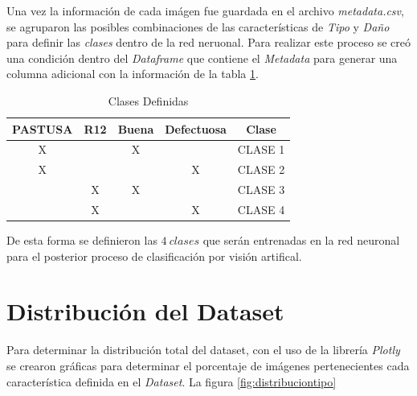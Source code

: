 	Una vez la información de cada imágen fue guardada en el archivo \textit{metadata.csv}, se agruparon las posibles combinaciones de las características de \textit{Tipo} y \textit{Daño} para definir las \textit{clases} dentro de la red neruonal. Para realizar este proceso se creó una condición dentro del \textit{Dataframe} que contiene el \textit{Metadata} para generar una columna adicional con la información de la tabla \ref{table:Clases}.	
	
	\begin{table}[ht]
		\centering
		\begin{tabular}{|c|c|c|c|c|}
			\hline
			PASTUSA & R12 & Buena & Defectuosa & Clase \\
			\hline
			X &  & X &  & CLASE 1 \\
			\hline
			X &  &  & X & CLASE 2 \\
			\hline
			& X & X &  & CLASE 3 \\
			\hline
			& X &  & X & CLASE 4 \\
			\hline
		\end{tabular}	
		\caption{Clases Definidas}
		\label{table:Clases}
	\end{table}	

De esta forma se definieron las $4 \ clases$ que serán entrenadas en la red neuronal para el posterior proceso de clasificación por visión artifical. 


\newpage
\section{Distribución del Dataset}
	  
	Para determinar la distribución total del dataset, con el uso de la librería \textit{Plotly} se crearon gráficas para determinar el porcentaje de imágenes pertenecientes cada característica definida en el \textit{Dataset}. La figura \ref{fig:distribuciontipo}
		
